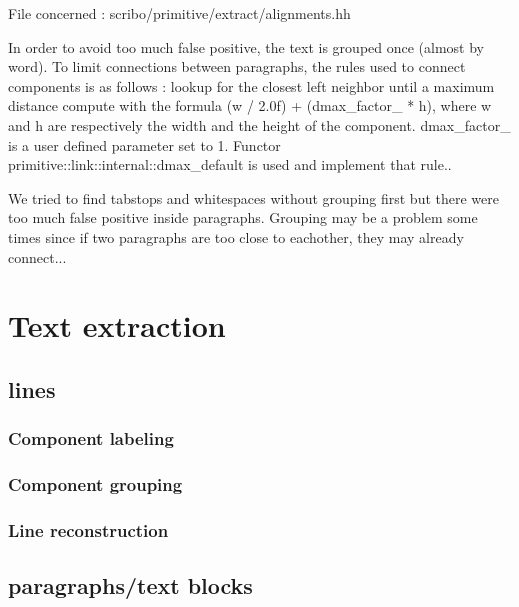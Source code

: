 \documentclass[a4]{book}
\begin{document}
File concerned : scribo/primitive/extract/alignments.hh

In order to avoid too much false positive, the text is grouped once
(almost by word).  To limit connections between paragraphs, the rules
used to connect components is as follows : lookup for the closest left
neighbor until a maximum distance compute with the formula (w / 2.0f)
+ (dmax_factor_ * h), where w and h are respectively the width and the
height of the component. dmax_factor_ is a user defined parameter set
to 1. Functor primitive::link::internal::dmax_default is used and
implement that rule..

We tried to find tabstops and whitespaces without grouping first but
there were too much false positive inside paragraphs.  Grouping may be
a problem some times since if two paragraphs are too close to
eachother, they may already connect...


\chapter{Text extraction}

\section{lines}

\subsection{Component labeling}

\subsection{Component grouping}

\subsection{Line reconstruction}



\section{paragraphs/text blocks}
\end{document}
